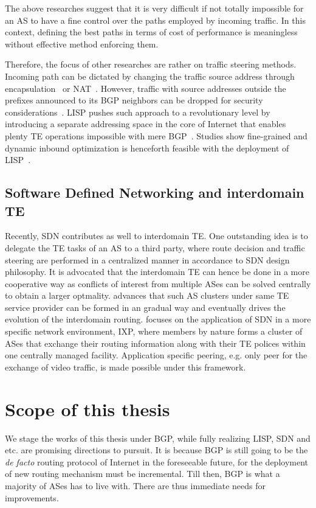 The above researches suggest that it is very difficult if not totally impossible for an AS to have a fine control over the paths employed by incoming traffic. In this context, defining the best paths in terms of cost of performance is meaningless without effective method enforcing them. 

Therefore, the focus of other researches are rather on traffic steering methods.
Incoming path can be dictated by changing the traffic source address through encapsulation~\cite{Liu2008} or \ac{NAT}~\cite{Sun2015}. However, traffic with source addresses outside the prefixes announced to its BGP neighbors can be dropped for security considerations~\cite{filtering}.
\ac{LISP} pushes such approach to a revolutionary level by introducing a separate addressing space in the core of Internet that enables plenty TE operations impossible with mere BGP~\cite{lisp}. Studies show fine-grained and dynamic inbound optimization is henceforth feasible with the deployment of \ac{LISP}~\cite{Iannone2007, saucez2011mechanisms, quoitin2007evaluating}.

\subsection{Software Defined Networking and interdomain TE}
Recently, \acf{SDN} contributes as well to interdomain TE. One outstanding idea is to delegate the TE tasks of an AS to a third party, where route decision and traffic steering are performed in a centralized manner in accordance to \ac{SDN} design philosophy. It is advocated that the interdomain TE can hence be done in a more cooperative way as conflicts of interest from multiple ASes can be solved centrally to obtain a larger optmality.
\citet{Kotronis2012} advances that such AS clusters under same TE service provider can be formed in an gradual way and eventually drives the evolution of the interdomain routing.
\citet{Gupta2014} focuses on the application of \ac{SDN} in a more specific network environment, \ac{IXP}, where members by nature forms a cluster of ASes that exchange their routing information along with their TE polices within one centrally managed facility. Application specific peering, e.g. only peer for the exchange of video traffic, is made possible under this framework.

\section{Scope of this thesis}
We stage the works of this thesis under BGP, while fully realizing \ac{LISP}, \ac{SDN} and etc. are promising directions to pursuit.
It is because BGP is still going to be the \textit{de facto} routing protocol of Internet in the foreseeable future, for the deployment of new routing mechanism must be incremental.
Till then,  BGP is what a majority of ASes has to live with. 
There are thus immediate needs for improvements.

